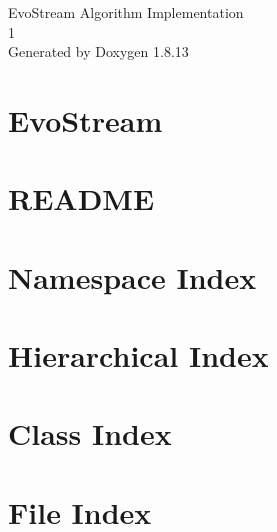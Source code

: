 \documentclass[twoside]{book}
\newcommand{\+}{\discretionary{\mbox{\scriptsize$\hookleftarrow$}}{}{}}
\newcommand{\clearemptydoublepage}{%
  \newpage{\pagestyle{empty}\cleardoublepage}%
}
\begin{document}
\hypersetup{pageanchor=false,
             bookmarksnumbered=true,
             pdfencoding=unicode
            }
\begin{titlepage}
\vspace*{7cm}
\begin{center}%
{\Large Evo\+Stream Algorithm Implementation \\[1ex]\large 1 }\\
\vspace*{1cm}
{\large Generated by Doxygen 1.8.13}\\
\end{center}
\end{titlepage}
\clearemptydoublepage
{}
\tableofcontents
\clearemptydoublepage
{}
\hypersetup{pageanchor=true}

\chapter{Evo\+Stream}
\label{md_evoStream_README}

\chapter{R\+E\+A\+D\+ME}
\label{md_README}

\chapter{Namespace Index}

\chapter{Hierarchical Index}

\chapter{Class Index}

\chapter{File Index}

\end{document}

